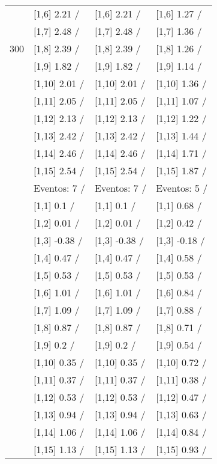 \begin{table}
\begin{tabular}[t]{llll}
 & {}[1,6] 2.21  / & {}[1,6] 2.21  / & {}[1,6] 1.27  /\\
 & {}[1,7] 2.48  / & {}[1,7] 2.48  / & {}[1,7] 1.36  /\\
300 & {}[1,8] 2.39  / & {}[1,8] 2.39  / & {}[1,8] 1.26  /\\
\addlinespace
 & {}[1,9] 1.82  / & {}[1,9] 1.82  / & {}[1,9] 1.14  /\\
 & {}[1,10] 2.01  / & {}[1,10] 2.01  / & {}[1,10] 1.36  /\\
 & {}[1,11] 2.05  / & {}[1,11] 2.05  / & {}[1,11] 1.07  /\\
 & {}[1,12] 2.13  / & {}[1,12] 2.13  / & {}[1,12] 1.22  /\\
 & {}[1,13] 2.42  / & {}[1,13] 2.42  / & {}[1,13] 1.44  /\\
\addlinespace
 & {}[1,14] 2.46  / & {}[1,14] 2.46  / & {}[1,14] 1.71  /\\
 & {}[1,15] 2.54  / & {}[1,15] 2.54  / & {}[1,15] 1.87  /\\
 & Eventos:  7 / & Eventos:  7 / & Eventos:  5 /\\
 & {}[1,1] 0.1  / & {}[1,1] 0.1  / & {}[1,1] 0.68  /\\
 & {}[1,2] 0.01  / & {}[1,2] 0.01  / & {}[1,2] 0.42  /\\
\addlinespace
 & {}[1,3] -0.38  / & {}[1,3] -0.38  / & {}[1,3] -0.18  /\\
 & {}[1,4] 0.47  / & {}[1,4] 0.47  / & {}[1,4] 0.58  /\\
 & {}[1,5] 0.53  / & {}[1,5] 0.53  / & {}[1,5] 0.53  /\\
 & {}[1,6] 1.01  / & {}[1,6] 1.01  / & {}[1,6] 0.84  /\\
 & {}[1,7] 1.09  / & {}[1,7] 1.09  / & {}[1,7] 0.88  /\\
\addlinespace
500 & {}[1,8] 0.87  / & {}[1,8] 0.87  / & {}[1,8] 0.71  /\\
 & {}[1,9] 0.2  / & {}[1,9] 0.2  / & {}[1,9] 0.54  /\\
 & {}[1,10] 0.35  / & {}[1,10] 0.35  / & {}[1,10] 0.72  /\\
 & {}[1,11] 0.37  / & {}[1,11] 0.37  / & {}[1,11] 0.38  /\\
 & {}[1,12] 0.53  / & {}[1,12] 0.53  / & {}[1,12] 0.47  /\\
\addlinespace
 & {}[1,13] 0.94  / & {}[1,13] 0.94  / & {}[1,13] 0.63  /\\
 & {}[1,14] 1.06  / & {}[1,14] 1.06  / & {}[1,14] 0.84  /\\
 & {}[1,15] 1.13  / & {}[1,15] 1.13  / & {}[1,15] 0.93  /\\
\bottomrule
\end{tabular}
\end{table}
